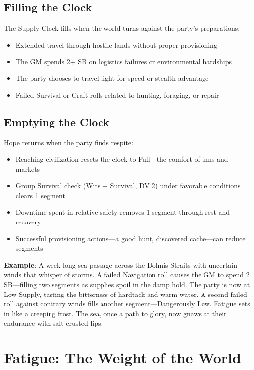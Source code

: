 \subsection*{Filling the Clock}

The Supply Clock fills when the world turns against the party's preparations:

\begin{itemize}
    \item Extended travel through hostile lands without proper provisioning
    \item The GM spends 2+ SB on logistics failures or environmental hardships
    \item The party chooses to travel light for speed or stealth advantage
    \item Failed Survival or Craft rolls related to hunting, foraging, or repair
\end{itemize}

\subsection*{Emptying the Clock}

Hope returns when the party finds respite:

\begin{itemize}
    \item Reaching civilization resets the clock to Full—the comfort of inns and markets
    \item Group Survival check (Wits + Survival, DV 2) under favorable conditions clears 1 segment
    \item Downtime spent in relative safety removes 1 segment through rest and recovery
    \item Successful provisioning actions—a good hunt, discovered cache—can reduce segments
\end{itemize}

\textbf{Example}: A week-long sea passage across the Dolmis Straits with uncertain winds that whisper of storms. A failed Navigation roll causes the GM to spend 2 SB---filling two segments as supplies spoil in the damp hold. The party is now at Low Supply, tasting the bitterness of hardtack and warm water. A second failed roll against contrary winds fills another segment---Dangerously Low. Fatigue sets in like a creeping frost. The sea, once a path to glory, now gnaws at their endurance with salt-crusted lips.

\section*{Fatigue: The Weight of the World}

